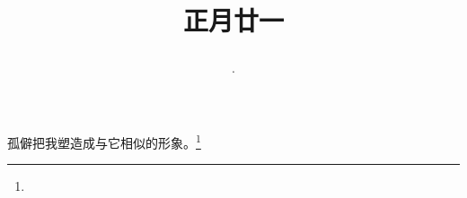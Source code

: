 \title{\date[d=1,m=3,y=2024][year:cn-y,年,month:cn,day:cn,日,·,weekday]·正月廿一 }
孤僻把我塑造成与它相似的形象。\footnote{ }

